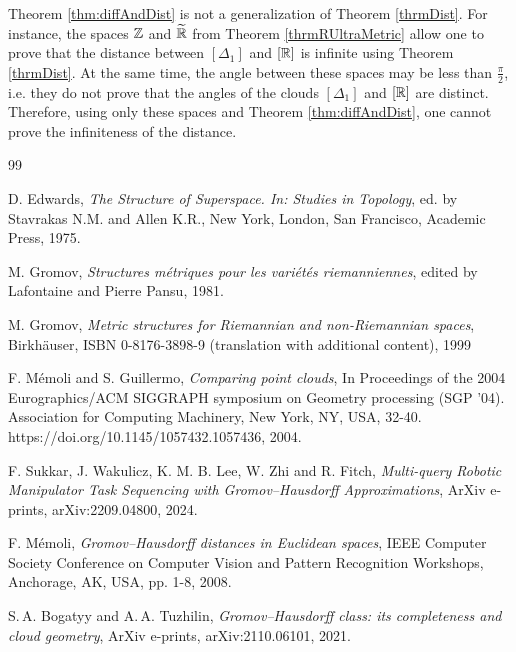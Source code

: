 \documentclass[leqno]{article}
\begin{document}
\begin{remark}
    Theorem \ref{thm:diffAndDist} is not a generalization of Theorem
    \ref{thrmDist}. For instance, the spaces \( {\mathbb Z} \) and \(
    \widetilde {\mathbb R} \) from
    Theorem \ref{thrmRUltraMetric} allow one to prove that the distance
    between \( [\Delta _1] \) and \( [\mathbb R] \) is infinite using
    Theorem \ref{thrmDist}. At the same time, the angle between these
    spaces may be less than \( \frac \pi 2 \), i.e. they do not
    prove that the angles of the clouds \( [\Delta _1] \) and \( [\mathbb R]
    \) are distinct. Therefore,
    using only these spaces and Theorem \ref{thm:diffAndDist}, one
    cannot prove the infiniteness of the distance.
\end{remark}

\begin{thebibliography}{99}

     D. Edwards, \emph{The Structure of Superspace.
    In: Studies in Topology}, ed. by Stavrakas N.M. and Allen K.R., New
    York, London, San Francisco, Academic Press, 1975.

     M. Gromov, \emph{Structures m\'etriques pour les
    vari\'et\'es riemanniennes}, edited by Lafontaine and Pierre Pansu, 1981.

     M. Gromov, \emph{Metric structures for
    Riemannian and non-Riemannian spaces}, Birkh\"auser, ISBN
    0-8176-3898-9 (translation with additional content), 1999

    F. M\'emoli and S. Guillermo, \emph{Comparing point clouds}, In
    Proceedings of the 2004 Eurographics/ACM SIGGRAPH symposium on
    Geometry processing (SGP '04). Association for Computing Machinery,
    New York, NY, USA, 32-40. https://doi.org/10.1145/1057432.1057436, 2004.

     F. Sukkar, J. Wakulicz, K. M. B. Lee, W. Zhi and
    R. Fitch, \emph{Multi-query Robotic Manipulator Task Sequencing
    with Gromov--Hausdorff Approximations}, ArXiv e-prints,
    arXiv:2209.04800, 2024.

    F. M\'emoli, \emph{Gromov--Hausdorff distances in Euclidean
    spaces}, IEEE Computer Society Conference on Computer Vision and
    Pattern Recognition Workshops, Anchorage, AK, USA, pp. 1-8, 2008.

    S.\,A. Bogatyy and A.\,A. Tuzhilin, \emph{Gromov--Hausdorff class:
    its completeness and cloud geometry}, ArXiv e-prints,
    arXiv:2110.06101, 2021.


\end{thebibliography}
\end{document}
